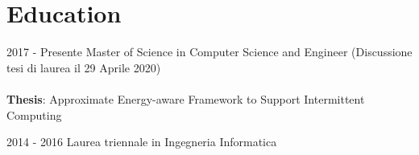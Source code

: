 \documentclass[letterpaper]{twentysecondcvit} %
\begin{document}
\makeprofile %

\section{Education}
\begin{twenty}
       \twentyitem
        {2017 -}
        {Presente}
        {Master of Science in Computer Science and Engineer}
        {}
        {
        (Discussione tesi di laurea il 29 Aprile 2020)\\ \\
        {
        \textbf{Thesis}: Approximate Energy-aware Framework to Support Intermittent Computing
        }
        }
        {\footnotesize{}}

    \twentyitem
        {2014 - 2016}
        {}
        {Laurea triennale in Ingegneria Informatica}
        {}
        {}
        {\footnotesize{}}
\end{twenty}


\end{document}
